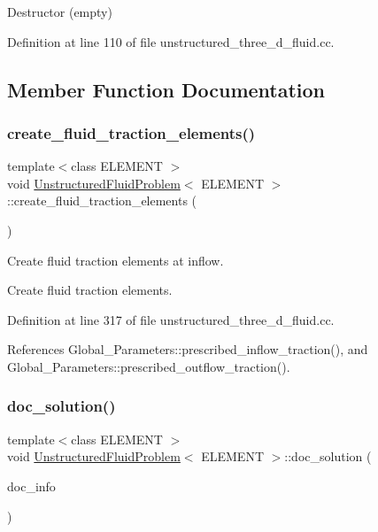 Destructor (empty) 



Definition at line 110 of file unstructured\+\_\+three\+\_\+d\+\_\+fluid.\+cc.



\subsection{Member Function Documentation}
\mbox{\label{classUnstructuredFluidProblem_ae95f1912572e8a5f0543eab9c0eb2634}} 
\subsubsection{\texorpdfstring{create\+\_\+fluid\+\_\+traction\+\_\+elements()}{create\_fluid\_traction\_elements()}}
{\footnotesize\ttfamily template$<$class E\+L\+E\+M\+E\+NT $>$ \\
void \hyperlink{classUnstructuredFluidProblem}{Unstructured\+Fluid\+Problem}$<$ E\+L\+E\+M\+E\+NT $>$\+::create\+\_\+fluid\+\_\+traction\+\_\+elements (\begin{DoxyParamCaption}{ }\end{DoxyParamCaption})}



Create fluid traction elements at inflow. 

Create fluid traction elements. 

Definition at line 317 of file unstructured\+\_\+three\+\_\+d\+\_\+fluid.\+cc.



References Global\+\_\+\+Parameters\+::prescribed\+\_\+inflow\+\_\+traction(), and Global\+\_\+\+Parameters\+::prescribed\+\_\+outflow\+\_\+traction().

\mbox{\label{classUnstructuredFluidProblem_abcc9f0065665ae5239988b1a812e3f78}} 
\subsubsection{\texorpdfstring{doc\+\_\+solution()}{doc\_solution()}}
{\footnotesize\ttfamily template$<$class E\+L\+E\+M\+E\+NT $>$ \\
void \hyperlink{classUnstructuredFluidProblem}{Unstructured\+Fluid\+Problem}$<$ E\+L\+E\+M\+E\+NT $>$\+::doc\+\_\+solution (\begin{DoxyParamCaption}\item[{Doc\+Info \&}]{doc\+\_\+info }\end{DoxyParamCaption})}



